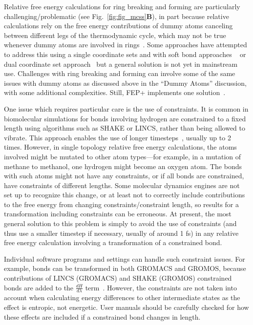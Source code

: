 \documentclass[9pt,bestpractices]{livecoms}
\begin{document}
 \label{subsec: Ring breaking and forming}
Relative free energy calculations for ring breaking and forming are particularly challenging/problematic (see Fig.~\ref{fig:fig_mcss}\textbf{B}), in part because relative calculations rely on the free energy contributions of dummy atoms canceling between different legs of the thermodynamic cycle, which may not be true whenever dummy atoms are involved in rings~\cite{liu2015ring}.
Some approaches have attempted to address this using a single coordinate sets and with soft bond approaches ~\cite{clark2019relative,wang2017accurate} or dual coordinate set approach~\cite{jespers2019qligfep, ries2022relative, bhati2017, bieniek2021} but a general solution is not yet in mainstream use. Challenges with ring breaking and forming can involve some of the same issues with dummy atoms as discussed above in the ``Dummy Atoms'' discussion, with some additional complexities. Still, FEP+ implements one solution~\cite{wang2017accurate}.

One issue which requires particular care is the use of constraints.
It is common in biomolecular simulations for bonds involving hydrogen are constrained to a fixed length using algorithms such as SHAKE or LINCS, rather than being allowed to vibrate.  This approach enables the use of longer timesteps~\cite{krautler2001fast}, usually up to 2 times. 
However, in single topology relative free energy calculations, the atoms involved might be mutated to other atom types---for example, in a mutation of methane to methanol, one hydrogen might become an oxygen atom. The bonds with such atoms might not have any constraints, or if all bonds are constrained, have constraints of different lengths. 
Some molecular dynamics engines are not set up to recognize this change, or at least not to correctly include contributions to the free energy from changing constraints/constraint length, so results for a transformation including constraints can be erroneous.
At present, the most general solution to this problem is simply to avoid the use of constraints (and thus use a smaller timestep if necessary, usually of around 1 fs) in any relative free energy calculation involving a transformation of a constrained bond. 

Individual software programs and settings can handle such constraint issues. For example, bonds can be transformed in both GROMACS and GROMOS, because contributions of LINCS (GROMACS) and SHAKE (GROMOS) constrained bonds are added to the $\frac{dH}{d\lambda}$ term~\cite{pearlman1993determining, straatsma1992holonomic, pearlman1991overlooked, gunsteren1989computer}. However, the constraints are not taken into account when calculating energy differences to other intermediate states as the effect is entropic, not energetic. User manuals should be carefully checked for how these effects are included if a constrained bond changes in length. 
\end{document}
